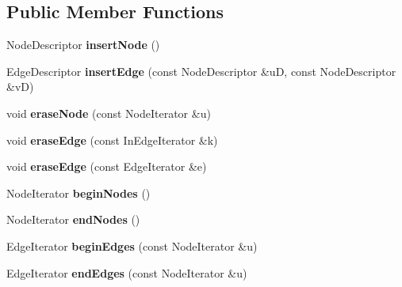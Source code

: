 \subsection*{Public Member Functions}
\begin{DoxyCompactItemize}
\item 
\hypertarget{class_adjacency_list_impl_a21ad2d9666f50eecbad3719e7f0946d1}{
NodeDescriptor {\bfseries insertNode} ()}
\label{class_adjacency_list_impl_a21ad2d9666f50eecbad3719e7f0946d1}

\item 
\hypertarget{class_adjacency_list_impl_ac26755c4f162e800347e47809ad1c699}{
EdgeDescriptor {\bfseries insertEdge} (const NodeDescriptor \&uD, const NodeDescriptor \&vD)}
\label{class_adjacency_list_impl_ac26755c4f162e800347e47809ad1c699}

\item 
\hypertarget{class_adjacency_list_impl_a5a339bc0b9a5db8705ed4dc971dfbb2d}{
void {\bfseries eraseNode} (const NodeIterator \&u)}
\label{class_adjacency_list_impl_a5a339bc0b9a5db8705ed4dc971dfbb2d}

\item 
\hypertarget{class_adjacency_list_impl_a587f3a5b4a51fda9525ca61a38c8288b}{
void {\bfseries eraseEdge} (const InEdgeIterator \&k)}
\label{class_adjacency_list_impl_a587f3a5b4a51fda9525ca61a38c8288b}

\item 
\hypertarget{class_adjacency_list_impl_a04590d815b151e7078e5f2ee187d5966}{
void {\bfseries eraseEdge} (const EdgeIterator \&e)}
\label{class_adjacency_list_impl_a04590d815b151e7078e5f2ee187d5966}

\item 
\hypertarget{class_adjacency_list_impl_a9dd9f5f17c3341ba088b46e90e9445da}{
NodeIterator {\bfseries beginNodes} ()}
\label{class_adjacency_list_impl_a9dd9f5f17c3341ba088b46e90e9445da}

\item 
\hypertarget{class_adjacency_list_impl_a83fa755fa21169199816cf113d37884f}{
NodeIterator {\bfseries endNodes} ()}
\label{class_adjacency_list_impl_a83fa755fa21169199816cf113d37884f}

\item 
\hypertarget{class_adjacency_list_impl_ab9757de454b7d68dc0d238228638c35f}{
EdgeIterator {\bfseries beginEdges} (const NodeIterator \&u)}
\label{class_adjacency_list_impl_ab9757de454b7d68dc0d238228638c35f}

\item 
\hypertarget{class_adjacency_list_impl_a4a21a140a91a94ece929a4d9887a29a1}{
EdgeIterator {\bfseries endEdges} (const NodeIterator \&u)}
\label{class_adjacency_list_impl_a4a21a140a91a94ece929a4d9887a29a1}


\end{DoxyCompactItemize}
